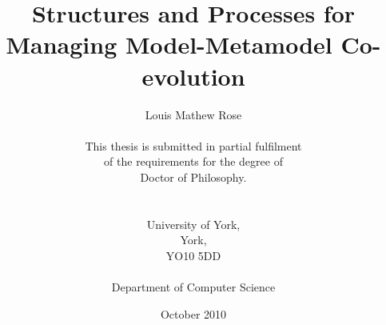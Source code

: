 \title{Structures and Processes for Managing Model-Metamodel Co-evolution}
\author{Louis Mathew Rose \\ \\
This thesis is submitted in partial fulfilment \\
of the requirements for the degree of \\
Doctor of Philosophy. \\
\\ \\
University of York, \\
York, \\ 
YO10 5DD \\
\\
Department of Computer Science \\ }
\date{October 2010}